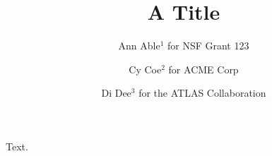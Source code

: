\documentclass{article}
\title{A Title}
\author{Ann Able$^{1}$ for NSF Grant 123 \and Cy Coe$^{2}$ for ACME Corp \and Di Dee$^{3}$ for the ATLAS Collaboration}
\begin{document}
\maketitle
Text.
\end{document}

